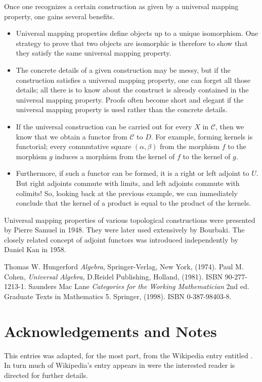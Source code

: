 \documentclass[12pt]{article}
\begin{document}
Once one recognizes a certain construction as given by a universal mapping
property, one gains several benefits.
\begin{itemize}
\item Universal mapping properties define objects up to a unique isomorphism.
  One strategy to prove that two objects are isomorphic is therefore
  to show that they satisfy the same universal mapping property.
\item The concrete details of a given construction may be messy, but
  if the construction satisfies a universal mapping property, one can forget
  all those details; all there is to know about the construct is
  already contained in the universal mapping property. Proofs often become
  short and elegant if the universal mapping property is used rather than the
  concrete details.
\item If the universal construction can be carried out for every $X$
  in $\mathcal{C}$, then we know that we obtain a functor from $\mathcal{C}$ to $D$.
  For example, forming kernels is functorial; every 
  commutative square
  $(\alpha,\beta)$ from the morphism $f$ to the morphism $g$ induces a
  morphism from the kernel of $f$ to the kernel of $g$.
\item Furthermore, if such a functor can be formed, it is a right or
  left adjoint to $U$. But right adjoints commute with limits, and
  left adjoints commute with colimits! So, looking back at the
  previous example, we can immediately conclude that the kernel of a
  product is equal to the product of the kernels.
\end{itemize}

Universal mapping properties of various topological constructions were
presented by Pierre Samuel in 1948. They were later used extensively
by Bourbaki. The closely related concept of adjoint functors was
introduced independently by Daniel Kan in 1958.


\begin{thebibliography}{10}
Thomas W. Hungerford \emph{Algebra}, Springer-Verlag, New York, (1974).
Paul M. Cohen, \emph{Universal Algebra}, D.Reidel
  Publishing, Holland, (1981). ISBN 90-277-1213-1.
Saunders Mac Lane \emph{Categories for the Working Mathematician} 2nd ed. Graduate 
Texts in Mathematics 5. Springer, (1998). ISBN 0-387-98403-8.
\end{thebibliography}

\section{Acknowledgements and Notes}
This entries was adapted, for the most part, from the Wikipedia entry
entitled .  In turn
  much of Wikipedia's entry appears in \cite[III.1]{MacLane} were the interested reader is directed for further details.
\end{document}
